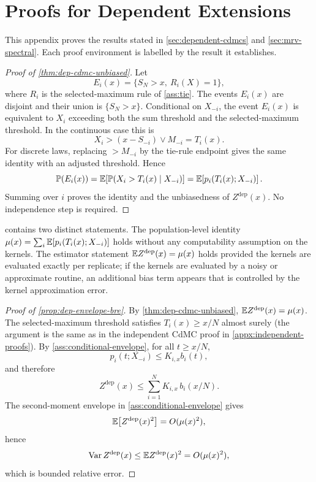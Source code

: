 \section{Proofs for Dependent Extensions}
\label{appx:dependent-proofs}

This appendix proves the results stated in \cref{sec:dependent-cdmcs} and
\cref{sec:mrv-spectral}. Each proof environment is labelled by the result it
establishes.

\begin{proof}[Proof of \cref{thm:dep-cdmc-unbiased}]
Let
\[
  E_i(x)=\{S_N>x,\ R_i(X)=1\},
\]
where \(R_i\) is the selected-maximum rule of \cref{ass:tie}. The events
\(E_i(x)\) are disjoint and their union is \(\{S_N>x\}\). Conditional on
\(X_{-i}\), the event \(E_i(x)\) is equivalent to \(X_i\) exceeding both the
sum threshold and the selected-maximum threshold. In the continuous case this
is
\[
  X_i>(x-S_{-i})\vee M_{-i}=T_i(x).
\]
For discrete laws, replacing \(>M_{-i}\) by the tie-rule endpoint gives the
same identity with an adjusted threshold. Hence
\[
  \mathbb{P}(E_i(x))
  =\mathbb{E}\!\left[\mathbb{P}(X_i>T_i(x)\mid X_{-i})\right]
  =\mathbb{E}\!\left[p_i(T_i(x);X_{-i})\right].
\]
Summing over \(i\) proves the identity and the unbiasedness of
\(Z^{\mathrm{dep}}(x)\). No independence step is required.
\end{proof}

\begin{remark}
\label{rem:pop-vs-est}
 contains two distinct statements. The
population-level identity
\(\mu(x)=\sum_i\mathbb{E}[p_i(T_i(x);X_{-i})]\) holds without any computability
assumption on the kernels. The estimator statement
\(\mathbb{E} Z^{\mathrm{dep}}(x)=\mu(x)\) holds provided the kernels are evaluated
exactly per replicate; if the kernels are evaluated by a noisy or approximate
routine, an additional bias term appears that is controlled by the kernel
approximation error.
\end{remark}

\begin{proof}[Proof of \cref{prop:dep-envelope-bre}]
By \cref{thm:dep-cdmc-unbiased}, \(\mathbb{E} Z^{\mathrm{dep}}(x)=\mu(x)\). The
selected-maximum threshold satisfies \(T_i(x)\ge x/N\) almost surely (the
argument is the same as in the independent CdMC proof in
\cref{appx:independent-proofs}). By \cref{ass:conditional-envelope}, for all
$t\ge x/N$,
\[
  p_i(t;X_{-i})\le K_{i,x}b_i(t),
\]
and therefore
\[
  Z^{\mathrm{dep}}(x)
  \le \sum_{i=1}^N K_{i,x}\, b_i(x/N).
\]
The second-moment envelope in \cref{ass:conditional-envelope} gives
\[
  \mathbb{E}\!\left[Z^{\mathrm{dep}}(x)^2\right]=O(\mu(x)^2),
\]
hence
\[
  \operatorname{Var} Z^{\mathrm{dep}}(x)\le \mathbb{E} Z^{\mathrm{dep}}(x)^2=O(\mu(x)^2),
\]
which is bounded relative error.
\end{proof}

